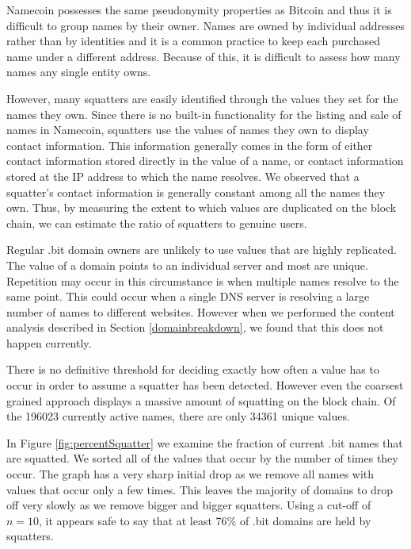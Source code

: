 Namecoin possesses the same pseudonymity properties as Bitcoin and thus it is difficult to group names by their owner. Names are owned by individual addresses rather than by identities and it is a common practice to keep each purchased name under a different address. Because of this, it is difficult to assess how many names any single entity owns. 

However, many squatters are easily identified through the values they set for the names they own. Since there is no built-in functionality for the listing and sale of names in Namecoin, squatters use the values of names they own to display contact information. This information generally comes in the form of either contact information stored directly in the value of a name, or contact information stored at the IP address to which the name resolves.  We observed that a squatter's contact information is generally constant among all the names they own. Thus, by measuring the extent to which values are duplicated on the block chain, we can estimate the ratio of squatters to genuine users.

Regular .bit domain owners are unlikely to use values that are highly replicated. The value of a domain points to an individual server and most are unique. Repetition may occur in this circumstance is when multiple names resolve to the same point. This could occur when a single DNS server is resolving a large number of names to different websites. However when we performed the content analysis described in Section \ref{domainbreakdown}, we found that this does not happen currently.

There is no definitive threshold for deciding exactly how often a value has to occur in order to assume a squatter has been detected. However even the coarsest grained approach displays a massive amount of squatting on the block chain. Of the 196023 currently active names, there are only 34361 unique values.

In Figure \ref{fig:percentSquatter} we examine the fraction of current .bit names that are squatted. We sorted all of the values that occur by the number of times they occur. 
The graph has a very sharp initial drop as we remove all names with values that occur only a few times. This leaves the majority of domains to drop off very slowly as we remove bigger and bigger squatters. Using a cut-off of $n=10$, it appears safe to say that at least 76\% of .bit domains are held by squatters.

